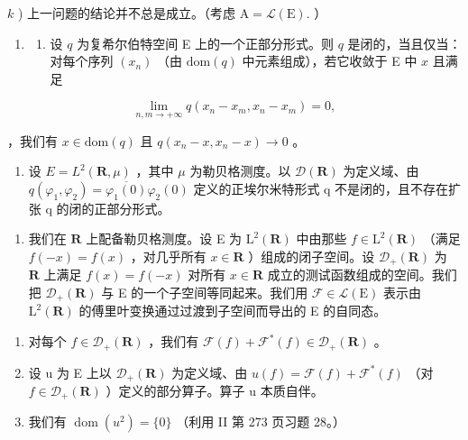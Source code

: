 \(k\) ) 上一问题的结论并不总是成立。（考虑 \(\mathrm{A} = \mathcal{L}(\mathrm{E}).\) ）

\begin{enumerate}
\def\labelenumi{\arabic{enumi})}
\setcounter{enumi}{10}
\tightlist
\item
  \begin{enumerate}
  \def\labelenumii{\alph{enumii})}
  \tightlist
  \item
    设 \(q\) 为复希尔伯特空间 E 上的一个正部分形式。则 \(q\) 是闭的，当且仅当：对每个序列 \((x_{n})\) （由 \(\text{dom}(q)\) 中元素组成），若它收敛于 E 中 \(x\) 且满足
  \end{enumerate}
\end{enumerate}

\[
\lim _ {n, m \to + \infty} q (x _ {n} - x _ {m}, x _ {n} - x _ {m}) = 0,
\]

，我们有 \(x \in \text{dom}(q)\) 且 \(q(x_{n} - x, x_{n} - x) \to 0\) 。

\begin{enumerate}
\def\labelenumi{\alph{enumi})}
\setcounter{enumi}{1}
\tightlist
\item
  设 \(E = L^{2}(\mathbf{R}, \mu)\) ，其中 \(\mu\) 为勒贝格测度。以 \(\mathcal{D}(\mathbf{R})\) 为定义域、由 \(q(\varphi_{1}, \varphi_{2}) = \overline{\varphi_{1}(0)}\varphi_{2}(0)\) 定义的正埃尔米特形式 q 不是闭的，且不存在扩张 q 的闭的正部分形式。
\end{enumerate}

\begin{enumerate}
\def\labelenumi{\arabic{enumi})}
\setcounter{enumi}{11}
\tightlist
\item
  我们在 \(\mathbf{R}\) 上配备勒贝格测度。设 E 为 \(\mathrm{L}^2 (\mathbf{R})\) 中由那些 \(f\in \mathrm{L}^2 (\mathbf{R})\) （满足 \(f(-x) = f(x)\) ，对几乎所有 \(x\in \mathbf{R}\) ）组成的闭子空间。设 \(\mathcal{D}_{+}(\mathbf{R})\) 为 \(\mathbf{R}\) 上满足 \(f(x) = f(-x)\) 对所有 \(x\in \mathbf{R}\) 成立的测试函数组成的空间。我们把 \(\mathcal{D}_{+}(\mathbf{R})\) 与 E 的一个子空间等同起来。我们用 \(\mathcal{F}\in \mathcal{L}(\mathrm{E})\) 表示由 \(\mathrm{L}^2 (\mathbf{R})\) 的傅里叶变换通过过渡到子空间而导出的 E 的自同态。
\end{enumerate}

\begin{enumerate}
\def\labelenumi{\alph{enumi})}
\item
  对每个 \(f \in \mathcal{D}_{+}(\mathbf{R})\) ，我们有 \(\mathcal{F}(f) + \mathcal{F}^{*}(f) \in \mathcal{D}_{+}(\mathbf{R})\) 。
\item
  设 u 为 E 上以 \(\mathcal{D}_{+}(\mathbf{R})\) 为定义域、由 \(u(f) = \mathcal{F}(f) + \mathcal{F}^{*}(f)\) （对 \(f \in \mathcal{D}_{+}(\mathbf{R})\) ）定义的部分算子。算子 u 本质自伴。
\item
  我们有 \(\operatorname{dom}(u^{2})=\{0\}\) （利用 II 第 273 页习题 28。）
\end{enumerate}

